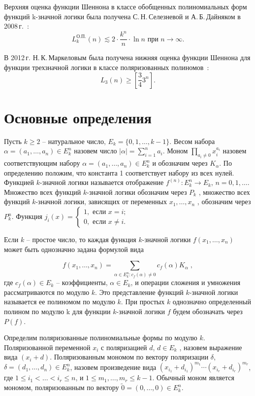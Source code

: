 \documentclass[bibliography=totoc, a4paper, 14pt]{extarticle}
\let\stdsection\section
\renewcommand\section{\newpage\stdsection}
\begin{document}
Верхняя оценка функции Шеннона в классе обобщенных полиномиальных форм функций k\nobreakdash-значной логики была получена
С.\,Н.\,Селезневой и А.\,Б.\,Дайняком в 2008\,г.~\cite{sd08}:
$$
L^{\text{О.П.}}_k(n) \lesssim 2\cdot\frac{k ^ n}{n}\cdot \ln n \text{ при } n \rightarrow \infty.
$$

В 2012\,г. Н.\,К.\,Маркеловым была получена нижняя оценка функции Шеннона для функции трехзначной логики в классе
поляризованных полиномов~\cite{mn12}:
$$
L_3(n) \geqslant \left[\frac{3}{4}3^n\right].
$$

\section{Основные определения}

Пусть $k \geqslant 2$ -- натуральное число, $E_k = \{0, 1, \dots, k - 1\}$. Весом набора
$\alpha = (a_1, \dots, a_n ) \in E_k^n$ назовем число $|\alpha| = \sum\limits_{i=1}^n a_i$.
Моном $\prod\limits_{a_i\neq0}x_i^{a_i}$ назовем соответствующим набору $\alpha =
(a_1, \dots, a_n ) \in E_k^n$ и обозначим через $K_{\alpha}$. По определению положим, что константа
1 соответствует набору из всех нулей. Функцией $k$\nobreakdash-значной логики называется
отображение $f^{(n)} : E_k^n \rightarrow E_k$, $n = 0, 1, \dots$.
Множество всех функций $k$-значной логики обозначим через $P_k$ , множество всех функций
$k$-значной логики, зависящих от переменных $x_1, \dots, x_n$ , обозначим через $P_k^n$.
Функция $j_i(x) = \begin{cases} 1, \text{ если } x = i; \\
                                0, \text{ если } x \neq i. \end{cases}$

Если $k$ -- простое число, то каждая функция $k$\nobreakdash-значной логики $f(x_1 , \dots , x_n)$
может быть однозначно задана формулой вида

$$ f(x_1, \dots, x_n) = \sum_{\alpha \in E_k^n:c_f(\alpha) \neq 0}c_f(\alpha)K_\alpha \; ,$$
где $c_f(\alpha) \in E_k$ -- коэффициенты, $\alpha \in E_k$, и операции сложения и умножения
рассматриваются по модулю $k$. Это представление функций $k$\nobreakdash-значной
логики называется ее полиномом по модулю $k$. При простых $k$ однозначно
определенный полином по модулю k для функции $k$\nobreakdash-значной логики $f$ будем
обозначать через $P(f)$.

Определим поляризованные полиномиальные формы по модулю $k$. Поляризованной переменной $x_i$ с поляризацией $d$,
$d \in E_k$ , назовем выражение вида $(x_i + d)$. Поляризованным мономом по вектору поляризации $\delta$,
$\delta = (d_1, \dots, d_n) \in E_k^n$, назовем произведение вида $(x_{i_1} + d_{i_1} )^{m_1}\cdots(x_{i_r} + d_{i_r})^{m_r}$,
где $1 \leqslant i_1 < \ldots < i_r \leqslant n$, и $1 \leqslant m_1 , \dots , m_r \leqslant k - 1$. Обычный моном является
мономом, поляризованным по вектору $\tilde{0} = (0, \dots, 0) \in E_k^n $.
\end{document}
